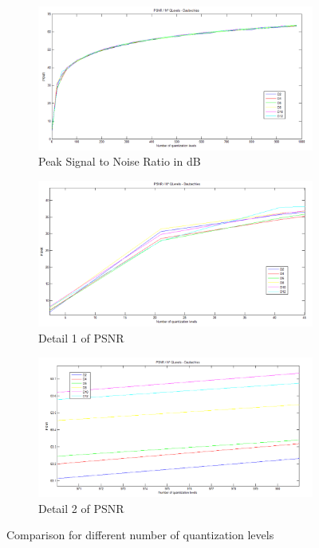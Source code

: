\documentclass[a4paper, 10pt, conference] {article}
\begin{document}
 \begin{figure}[H]
 	\centering
 	\begin{subfigure}{1\textwidth}
 		\centering
 		\includegraphics[scale=0.35]{reportImages/PSNR_Daubechies.PNG}
 		\caption{Peak Signal to Noise Ratio in dB}
 	\end{subfigure}
 	\begin{subfigure}{0.49\textwidth}
 		\centering
 		\includegraphics[scale=0.30]{reportImages/PSNR_Daubechies_detail.PNG}
 		\caption{Detail 1 of PSNR}
 	\end{subfigure}
 	\begin{subfigure}{0.49\textwidth}
 		\centering
 		\includegraphics[scale=0.30]{reportImages/PSNR_Daubechies_detail1.PNG}
 		\caption{Detail 2 of PSNR}
 	\end{subfigure}
 	
 	\caption{Comparison for different number of quantization levels }
 	\label{Levels1}
 \end{figure}
 
\end{document}
